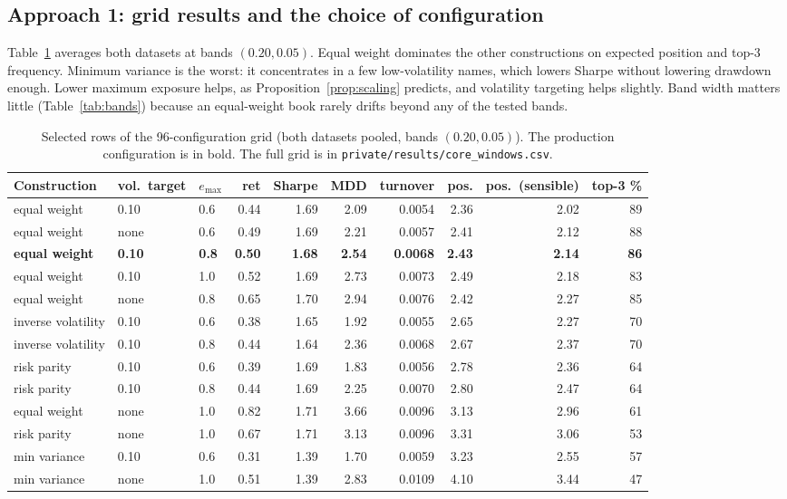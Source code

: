 \documentclass[11pt,a4paper]{article}
\newcommand{\code}[1]{\texttt{#1}}
\begin{document}
\subsection{Approach 1: grid results and the choice of configuration}\label{sec:choice}
Table~\ref{tab:grid} averages both datasets at bands $(0.20,0.05)$. Equal weight dominates the other constructions on
expected position and top-3 frequency. Minimum variance is the worst: it concentrates in a few low-volatility names, which lowers
Sharpe without lowering drawdown enough. Lower maximum exposure helps, as Proposition~\ref{prop:scaling} predicts, and
volatility targeting helps slightly. Band width matters little (Table~\ref{tab:bands}) because an equal-weight book
rarely drifts beyond any of the tested bands.

\begin{table}[h]
\centering\footnotesize
\begin{tabular}{lllrrrrrrr}
\toprule
Construction & vol.\ target & $e_{\max}$ & ret & Sharpe & MDD & turnover & pos. & pos.\ (sensible) & top-3 \% \\
\midrule
equal weight & 0.10 & 0.6 & 0.44 & 1.69 & 2.09 & 0.0054 & 2.36 & 2.02 & 89 \\
equal weight & none & 0.6 & 0.49 & 1.69 & 2.21 & 0.0057 & 2.41 & 2.12 & 88 \\
\textbf{equal weight} & \textbf{0.10} & \textbf{0.8} & \textbf{0.50} & \textbf{1.68} & \textbf{2.54} & \textbf{0.0068} & \textbf{2.43} & \textbf{2.14} & \textbf{86} \\
equal weight & 0.10 & 1.0 & 0.52 & 1.69 & 2.73 & 0.0073 & 2.49 & 2.18 & 83 \\
equal weight & none & 0.8 & 0.65 & 1.70 & 2.94 & 0.0076 & 2.42 & 2.27 & 85 \\
inverse volatility & 0.10 & 0.6 & 0.38 & 1.65 & 1.92 & 0.0055 & 2.65 & 2.27 & 70 \\
inverse volatility & 0.10 & 0.8 & 0.44 & 1.64 & 2.36 & 0.0068 & 2.67 & 2.37 & 70 \\
risk parity & 0.10 & 0.6 & 0.39 & 1.69 & 1.83 & 0.0056 & 2.78 & 2.36 & 64 \\
risk parity & 0.10 & 0.8 & 0.44 & 1.69 & 2.25 & 0.0070 & 2.80 & 2.47 & 64 \\
equal weight & none & 1.0 & 0.82 & 1.71 & 3.66 & 0.0096 & 3.13 & 2.96 & 61 \\
risk parity & none & 1.0 & 0.67 & 1.71 & 3.13 & 0.0096 & 3.31 & 3.06 & 53 \\
min variance & 0.10 & 0.6 & 0.31 & 1.39 & 1.70 & 0.0059 & 3.23 & 2.55 & 57 \\
min variance & none & 1.0 & 0.51 & 1.39 & 2.83 & 0.0109 & 4.10 & 3.44 & 47 \\
\bottomrule
\end{tabular}
\caption{Selected rows of the 96-configuration grid (both datasets pooled, bands $(0.20,0.05)$). The production
configuration is in bold. The full grid is in \code{private/results/core\_windows.csv}.}
\label{tab:grid}
\end{table}
\end{document}
